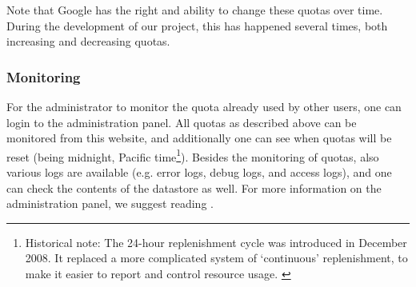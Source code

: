 Note that Google has the right and ability to change these quotas over time.
During the development of our project, this has happened several times, both
increasing and decreasing quotas.

\subsubsection{Monitoring}
For the administrator to monitor the quota already used by other users, one can
login to the administration panel. All quotas as described above can be monitored
from this website, and additionally one can see when quotas will be reset (being
midnight, Pacific time\footnote{Historical note: The 24-hour replenishment cycle
was introduced in December 2008. It replaced a more complicated system of
`continuous' replenishment, to make it easier to report and control resource
usage. \cite{app-engine-quotas}}).  Besides the monitoring of quotas, also
various logs are available (e.g. error logs, debug logs, and access logs), and
one can check the contents of the datastore as well. For more information on the
administration panel, we suggest reading \cite{app-engine-admin}.

